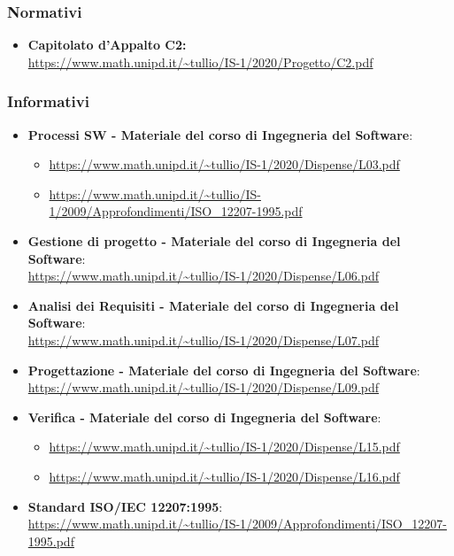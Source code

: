 \subsubsection{Normativi}\label{RiferimentiNormativi}
\begin{itemize}
\item \textbf{Capitolato d'Appalto C2:}\\
\url{https://www.math.unipd.it/~tullio/IS-1/2020/Progetto/C2.pdf}
\end{itemize}

\subsubsection{Informativi}\label{RiferimentiInformativi}
\begin{itemize}
	\item \textbf{Processi SW - Materiale del corso di Ingegneria del Software}:
	\begin{itemize}
		\item \url{https://www.math.unipd.it/~tullio/IS-1/2020/Dispense/L03.pdf}
		\item \url{https://www.math.unipd.it/~tullio/IS-1/2009/Approfondimenti/ISO_12207-1995.pdf}
	\end{itemize}
	\item \textbf{Gestione di progetto - Materiale del corso di Ingegneria del Software}:\\
	\url{https://www.math.unipd.it/~tullio/IS-1/2020/Dispense/L06.pdf}
	\item \textbf{Analisi dei Requisiti - Materiale del corso di Ingegneria del Software}:\\
	\url{https://www.math.unipd.it/~tullio/IS-1/2020/Dispense/L07.pdf}
	\item \textbf{Progettazione - Materiale del corso di Ingegneria del Software}:\\
	\url{https://www.math.unipd.it/~tullio/IS-1/2020/Dispense/L09.pdf}
	\item \textbf{Verifica - Materiale del corso di Ingegneria del Software}:
	\begin{itemize}
		\item \url{https://www.math.unipd.it/~tullio/IS-1/2020/Dispense/L15.pdf}
		\item \url{https://www.math.unipd.it/~tullio/IS-1/2020/Dispense/L16.pdf}
	\end{itemize}
	\item \textbf{Standard ISO/IEC 12207:1995}:\\
	\url{https://www.math.unipd.it/~tullio/IS-1/2009/Approfondimenti/ISO_12207-1995.pdf}

\end{itemize}
